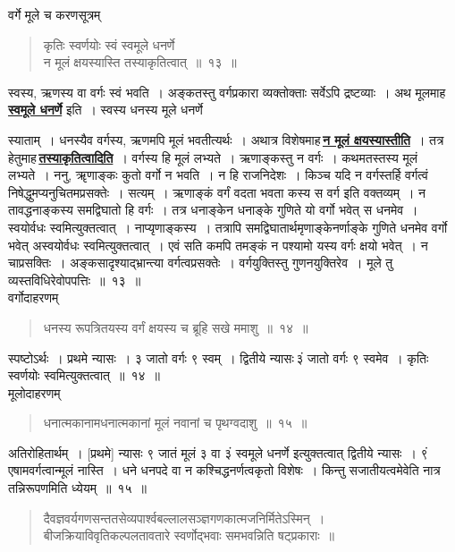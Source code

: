 \documentclass[11pt, openany]{book}
\begin{document}
{\bqt वर्गे मूले च करणसूत्रम्\textendash }

 \label{13}
 \begin{quote}
     \ab
     कृतिः स्वर्णयोः स्वं स्वमूले धनर्णे \\
 न मूलं क्षयस्यास्ति तस्याकृतित्वात्~॥~१३~॥~
 \end{quote}
 
 स्वस्य, ऋणस्य वा वर्गः स्वं भवति~। अङ्कतस्तु वर्गप्रकारा व्यक्तोक्ताः
सर्वेऽपि द्रष्टव्याः~। अथ मूलमाह\textendash \,\hyperref[13]{\textbf{स्वमूले धनर्णे}} इति~। स्वस्य धनस्य मूले धनर्णे
\newpage

\noindent स्याताम्~। धनस्यैव वर्गस्य, ऋणमपि मूलं भवतीत्यर्थः~। अथात्र
विशेषमाह\textendash \,\hyperref[13]{\textbf{न मूलं क्षयस्यास्तीति}}~। तत्र हेतुमाह\textendash \,\hyperref[13]{\textbf{तस्याकृतित्वादिति}}~। वर्गस्य हि
मूलं लभ्यते~। ऋणाङ्कस्तु न वर्गः~। कथमतस्तस्य मूलं लभ्यते~। ननु, ॠणाङ्कः
कुतो वर्गो न भवति~। न हि राजनिदेशः~। किञ्च यदि न वर्गस्तर्हि वर्गत्वं
निषेद्धुमप्यनुचितमप्रसक्तेः~। सत्यम्~। ऋणाङ्कं वर्गं वदता भवता कस्य स वर्ग इति
वक्तव्यम्~। न तावद्धनाङ्कस्य समद्विघातो हि वर्गः~। तत्र धनाङ्केन
धनाङ्के गुणिते यो वर्गो भवेत् स धनमेव~। स्वयोर्वधः स्वमित्युक्तत्वात्~।
नाप्यृणाङ्कस्य~। तत्रापि समद्विघातार्थमृणाङ्केनर्णाङ्के गुणिते धनमेव वर्गो भवेत्
अस्वयोर्वधः स्वमित्युक्तत्वात्~। एवं सति कमपि तमङ्कं न पश्यामो यस्य वर्गः क्षयो
भवेत्~। न चाप्रसक्तिः~। अङ्कसादृश्याद्भ्रान्त्या वर्गत्वप्रसक्तेः~।
वर्गयुक्तिस्तु गुणनयुक्तिरेव~।
मूले तु व्यस्तविधिरेवोपपत्तिः~॥~१३~॥\\

\vspace{-2mm}
{\bqt वर्गोदाहरणम्\textendash }
\begin{quote}
    \eg
    धनस्य रूपत्रितयस्य वर्गं क्षयस्य च ब्रूहि सखे ममाशु~॥~१४~॥
\end{quote}
 
 स्पष्टोऽर्थः~। प्रथमे न्यासः~। ३ जातो वर्गः ९ स्वम्~। द्वितीये न्यासः\textendash \,३ं जातो वर्गः ९ स्वमेव~। कृतिः स्वर्णयोः स्वमित्युक्तत्वात्~॥~१४~॥\\

\vspace{-2mm}
{\bqt मूलोदाहरणम्\textendash }
\begin{quote}
    \eg
     धनात्मकानामधनात्मकानां मूलं नवानां च पृथग्वदाशु~॥~१५~॥
\end{quote}

 अतिरोहितार्थम्~। [प्रथमे] न्यासः ९ जातं मूलं ३ वा ३ं स्वमूले
धनर्णे इत्युक्तत्वात् द्वितीये न्यासः~। ९ं एषामवर्गत्वान्मूलं नास्ति~। धने
धनपदे वा न कश्चिद्धनर्णत्वकृतो विशेषः~। किन्तु सजातीयत्वमेवेति नात्र तन्निरूपणमिति
ध्येयम्~॥~१५~॥
\newpage
\begin{quote}
{\qt दैवज्ञवर्यगणसन्ततसेव्यपार्श्वबल्लालसञ्ज्ञगणकात्मजनिर्मितेऽस्मिन्~।\\
बीजक्रियाविवृतिकल्पलतावतारे स्वर्णोद्भवाः समभवन्निति षट्प्रकाराः~॥}
\end{quote}
\end{document}
